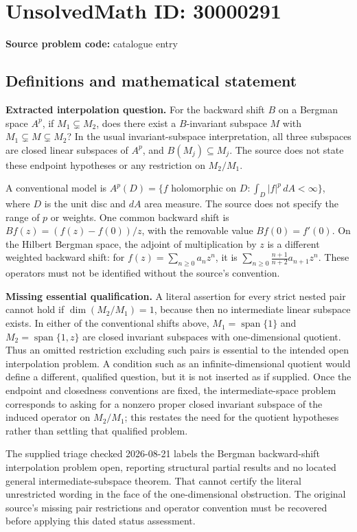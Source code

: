 \documentclass[11pt]{article}
\begin{document}
\section*{UnsolvedMath ID: 30000291}
\textbf{Source problem code:} catalogue entry
\subsection{Definitions and mathematical statement}
\textbf{Extracted interpolation question.} For the backward shift \(B\) on a Bergman space \(A^p\), if \(M_1\subsetneq M_2\), does there exist a \(B\)-invariant subspace \(M\) with \(M_1\subsetneq M\subsetneq M_2\)? In the usual invariant-subspace interpretation, all three subspaces are closed linear subspaces of \(A^p\), and \(B(M_j)\subseteq M_j\). The source does not state these endpoint hypotheses or any restriction on \(M_2/M_1\).\par A conventional model is \(A^p(D)=\{f\text{ holomorphic on }D:\int_D|f|^p\,dA<\infty\}\), where \(D\) is the unit disc and \(dA\) area measure. The source does not specify the range of \(p\) or weights. One common backward shift is \(Bf(z)=(f(z)-f(0))/z\), with the removable value \(Bf(0)=f'(0)\). On the Hilbert Bergman space, the adjoint of multiplication by \(z\) is a different weighted backward shift: for \(f(z)=\sum_{n\ge0}a_nz^n\), it is \(\sum_{n\ge0}\frac{n+1}{n+2}a_{n+1}z^n\). These operators must not be identified without the source's convention.\par \textbf{Missing essential qualification.} A literal assertion for every strict nested pair cannot hold if \(\dim(M_2/M_1)=1\), because then no intermediate linear subspace exists. In either of the conventional shifts above, \(M_1=\operatorname{span}\{1\}\) and \(M_2=\operatorname{span}\{1,z\}\) are closed invariant subspaces with one-dimensional quotient. Thus an omitted restriction excluding such pairs is essential to the intended open interpolation problem. A condition such as an infinite-dimensional quotient would define a different, qualified question, but it is not inserted as if supplied. Once the endpoint and closedness conventions are fixed, the intermediate-space problem corresponds to asking for a nonzero proper closed invariant subspace of the induced operator on \(M_2/M_1\); this restates the need for the quotient hypotheses rather than settling that qualified problem.\par The supplied triage checked 2026-08-21 labels the Bergman backward-shift interpolation problem open, reporting structural partial results and no located general intermediate-subspace theorem. That cannot certify the literal unrestricted wording in the face of the one-dimensional obstruction. The original source's missing pair restrictions and operator convention must be recovered before applying this dated status assessment.
\end{document}
